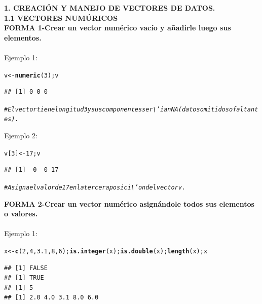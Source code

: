 \documentclass[12pt,letterpaper]{article}\usepackage[]{graphicx}\usepackage[]{color}
\makeatletter
\newcommand{\hlnum}[1]{\textcolor[rgb]{0.686,0.059,0.569}{#1}}%
\newcommand{\hlcom}[1]{\textcolor[rgb]{0.678,0.584,0.686}{\textit{#1}}}%
\newcommand{\hlstd}[1]{\textcolor[rgb]{0.345,0.345,0.345}{#1}}%
\newcommand{\hlkwb}[1]{\textcolor[rgb]{0.69,0.353,0.396}{#1}}%
\newcommand{\hlkwd}[1]{\textcolor[rgb]{0.737,0.353,0.396}{\textbf{#1}}}%
\newenvironment{kframe}{%
 \def\at@end@of@kframe{}%
 \ifinner\ifhmode%
  \def\at@end@of@kframe{\end{minipage}}%
  \begin{minipage}{\columnwidth}%
 \fi\fi%
 \def\FrameCommand##1{\hskip\@totalleftmargin \hskip-\fboxsep
 \colorbox{shadecolor}{##1}\hskip-\fboxsep
     \hskip-\linewidth \hskip-\@totalleftmargin \hskip\columnwidth}%
 \MakeFramed {\advance\hsize-\width
   \@totalleftmargin\z@ \linewidth\hsize
   \@setminipage}}%
 {\par\unskip\endMakeFramed%
 \at@end@of@kframe}
\newenvironment{knitrout}{}{} %
\makeatother
\begin{document}
\textbf{1. CREACI\'ON Y MANEJO DE VECTORES DE DATOS.}\\

\textbf{1.1 VECTORES NUM\'URICOS}\\

\textbf{FORMA 1-Crear un vector num\'erico vac\'io y a\~nadirle luego sus elementos.}\\

\\ Ejemplo 1:
\begin{knitrout}
\color{fgcolor}\begin{kframe}
\begin{alltt}
\hlstd{v} \hlkwb{<-} \hlkwd{numeric}\hlstd{(}\hlnum{3}\hlstd{);v}
\end{alltt}
\begin{verbatim}
## [1] 0 0 0
\end{verbatim}
\begin{alltt}
\hlcom{# El vector tiene longitud 3 y sus componentes ser\textbackslash{}'ian NA (datos omitidos o faltantes).}
\end{alltt}
\end{kframe}
\end{knitrout}
Ejemplo 2: 
\begin{knitrout}
\color{fgcolor}\begin{kframe}
\begin{alltt}
\hlstd{v[}\hlnum{3}\hlstd{]} \hlkwb{<-} \hlnum{17}\hlstd{; v}
\end{alltt}
\begin{verbatim}
## [1]  0  0 17
\end{verbatim}
\begin{alltt}
\hlcom{# Asigna el valor de 17 en la tercera posici\textbackslash{}'on del vector v.}
\end{alltt}
\end{kframe}
\end{knitrout}

\textbf{FORMA 2-Crear un vector num\'erico asign\'andole todos sus elementos o valores.}\\

\\ Ejemplo 1:
\begin{knitrout}
\color{fgcolor}\begin{kframe}
\begin{alltt}
\hlstd{x} \hlkwb{<-} \hlkwd{c}\hlstd{(}\hlnum{2}\hlstd{,} \hlnum{4}\hlstd{,} \hlnum{3.1}\hlstd{,} \hlnum{8}\hlstd{,} \hlnum{6}\hlstd{);}\hlkwd{is.integer}\hlstd{(x);}\hlkwd{is.double}\hlstd{(x);}\hlkwd{length}\hlstd{(x);x}
\end{alltt}
\begin{verbatim}
## [1] FALSE
## [1] TRUE
## [1] 5
## [1] 2.0 4.0 3.1 8.0 6.0
\end{verbatim}
\end{kframe}
\end{knitrout}
\end{document}

